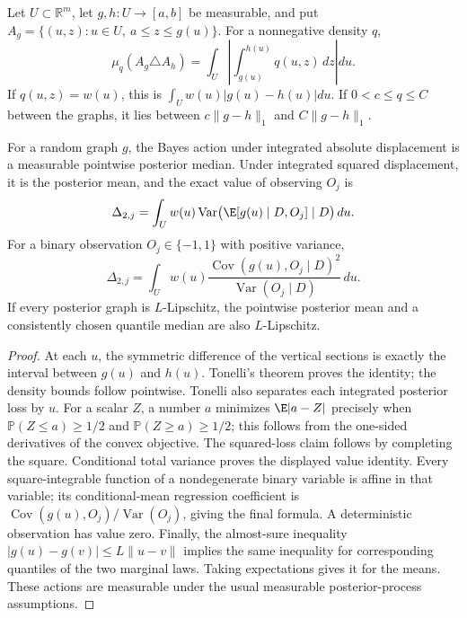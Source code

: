 \begin{proposition}
\label{rthreegeo:graphloss}
Let $U\subset\mathbb R^m$, let $g,h:U\to[a,b]$ be measurable, and put
$A_g=\{(u,z):u\in U,\ a\le z\le g(u)\}$.
For a nonnegative density $q$,
\[
 \mu_q(A_g\triangle A_h)
 =\int_U\left|\int_{g(u)}^{h(u)}q(u,z)\,dz\right|du.
\]
If $q(u,z)=w(u)$, this is $\int_Uw(u)|g(u)-h(u)|du$.
If $0<c\le q\le C$ between the graphs, it lies between
$c\|g-h\|_1$ and $C\|g-h\|_1$.

For a random graph $g$, the Bayes action under integrated absolute
displacement is a measurable pointwise posterior median. Under
integrated squared displacement, it is the posterior mean, and the
exact value of observing $O_j$ is
\[
 \Delta_{2,j}
 =\int_Uw(u)\operatorname{Var}\bigl(\E[g(u)\mid D,O_j]\mid D\bigr)\,du.
\]
For a binary observation $O_j\in\{-1,1\}$ with positive variance,
\[
 \Delta_{2,j}
 =\int_Uw(u)
 \frac{\operatorname{Cov}(g(u),O_j\mid D)^2}
      {\operatorname{Var}(O_j\mid D)}\,du.
\]
If every posterior graph is $L$-Lipschitz, the pointwise posterior mean
and a consistently chosen quantile median are also $L$-Lipschitz.
\end{proposition}
\begin{proof}
At each $u$, the symmetric difference of the vertical sections is exactly
the interval between $g(u)$ and $h(u)$. Tonelli's theorem proves the
identity; the density bounds follow pointwise.
Tonelli also separates each integrated posterior loss by $u$.
For a scalar $Z$, a number $a$ minimizes $\E|a-Z|$ precisely when
$\mathbb P(Z\le a)\ge1/2$ and $\mathbb P(Z\ge a)\ge1/2$; this follows
from the one-sided derivatives of the convex objective. The squared-loss
claim follows by completing the square.
Conditional total variance proves the displayed value identity.
Every square-integrable function of a nondegenerate binary variable is
affine in that variable; its conditional-mean regression coefficient is
$\operatorname{Cov}(g(u),O_j)/\operatorname{Var}(O_j)$, giving the final
formula. A deterministic observation has value zero.
Finally, the almost-sure inequality
$|g(u)-g(v)|\le L\|u-v\|$ implies the same inequality for corresponding
quantiles of the two marginal laws. Taking expectations gives it for
the means. These actions are measurable under the usual measurable
posterior-process assumptions.
\end{proof}

